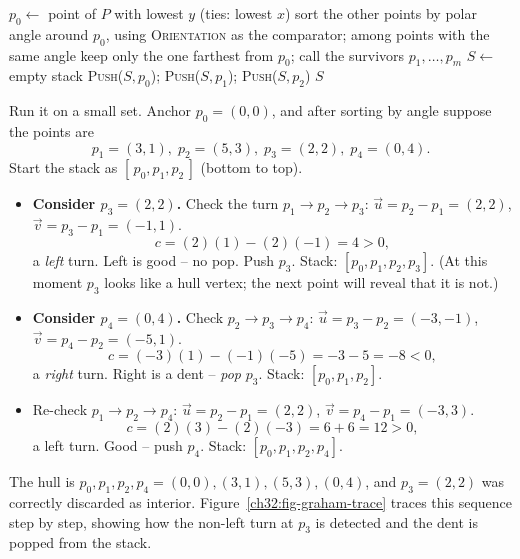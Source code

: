 \begin{algorithm}[H]
\caption{\textsc{GrahamScan}($P$)}
$p_0 \leftarrow$ point of $P$ with lowest $y$ (ties: lowest $x$)\;
sort the other points by polar angle around $p_0$, using \textsc{Orientation} as the comparator; among points with the same angle keep only the one farthest from $p_0$; call the survivors $p_1, \dots, p_{m}$\;
$S \leftarrow$ empty stack\;
\textsc{Push}($S, p_0$);\; \textsc{Push}($S, p_1$);\; \textsc{Push}($S, p_2$)\;
\Return $S$\;
\end{algorithm}

\begin{labbox}
Run it on a small set. Anchor $p_0=(0,0)$, and after sorting by angle suppose the
points are
\[
  p_1=(3,1),\; p_2=(5,3),\; p_3=(2,2),\; p_4=(0,4).
\]
Start the stack as $[\,p_0, p_1, p_2\,]$ (bottom to top).
\begin{itemize}
  \item \textbf{Consider $p_3=(2,2)$.} Check the turn $p_1 \to p_2 \to p_3$:
        $\vec u=p_2-p_1=(2,2)$, $\vec v=p_3-p_1=(-1,1)$.
        \[ c = (2)(1)-(2)(-1) = 4 > 0, \]
        a \emph{left} turn. Left is good -- no pop. Push $p_3$. Stack:
        $[p_0,p_1,p_2,p_3]$. (At this moment $p_3$ looks like a hull vertex; the
        next point will reveal that it is not.)
  \item \textbf{Consider $p_4=(0,4)$.} Check $p_2 \to p_3 \to p_4$:
        $\vec u=p_3-p_2=(-3,-1)$, $\vec v=p_4-p_2=(-5,1)$.
        \[ c = (-3)(1)-(-1)(-5) = -3-5 = -8 < 0, \]
        a \emph{right} turn. Right is a dent --
        \emph{pop} $p_3$. Stack: $[p_0,p_1,p_2]$.
  \item Re-check $p_1 \to p_2 \to p_4$: $\vec u=p_2-p_1=(2,2)$,
        $\vec v=p_4-p_1=(-3,3)$.
        \[ c = (2)(3)-(2)(-3) = 6+6 = 12 > 0, \]
        a left turn. Good --
        push $p_4$. Stack: $[p_0,p_1,p_2,p_4]$.
\end{itemize}
The hull is $p_0,p_1,p_2,p_4 = (0,0),(3,1),(5,3),(0,4)$, and $p_3=(2,2)$ was
correctly discarded as interior. Figure~\ref{ch32:fig-graham-trace} traces this
sequence step by step, showing how the non-left turn at $p_3$ is detected and
the dent is popped from the stack.
\end{labbox}

